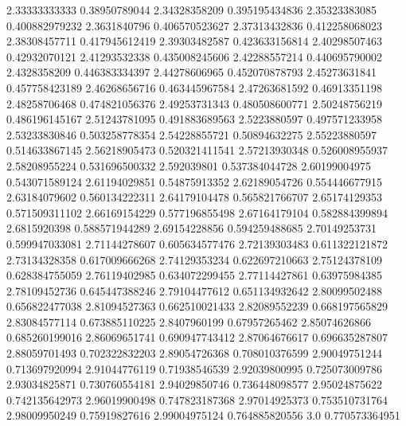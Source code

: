   2.33333333333    0.38950789044
  2.34328358209   0.395195434836
  2.35323383085   0.400882979232
   2.3631840796   0.406570523627
  2.37313432836   0.412258068023
  2.38308457711   0.417945612419
  2.39303482587   0.423633156814
  2.40298507463    0.42932070121
  2.41293532338   0.435008245606
  2.42288557214   0.440695790002
   2.4328358209   0.446383334397
  2.44278606965   0.452070878793
  2.45273631841   0.457758423189
  2.46268656716   0.463445967584
  2.47263681592    0.46913351198
  2.48258706468   0.474821056376
  2.49253731343   0.480508600771
  2.50248756219   0.486196145167
  2.51243781095   0.491883689563
   2.5223880597   0.497571233958
  2.53233830846   0.503258778354
  2.54228855721    0.50894632275
  2.55223880597   0.514633867145
  2.56218905473   0.520321411541
  2.57213930348   0.526008955937
  2.58208955224   0.531696500332
    2.592039801   0.537384044728
  2.60199004975   0.543071589124
  2.61194029851    0.54875913352
  2.62189054726   0.554446677915
  2.63184079602   0.560134222311
  2.64179104478   0.565821766707
  2.65174129353   0.571509311102
  2.66169154229   0.577196855498
  2.67164179104   0.582884399894
   2.6815920398   0.588571944289
  2.69154228856   0.594259488685
  2.70149253731   0.599947033081
  2.71144278607   0.605634577476
  2.72139303483   0.611322121872
  2.73134328358   0.617009666268
  2.74129353234   0.622697210663
  2.75124378109   0.628384755059
  2.76119402985   0.634072299455
  2.77114427861    0.63975984385
  2.78109452736   0.645447388246
  2.79104477612   0.651134932642
  2.80099502488   0.656822477038
  2.81094527363   0.662510021433
  2.82089552239   0.668197565829
  2.83084577114   0.673885110225
   2.8407960199    0.67957265462
  2.85074626866   0.685260199016
  2.86069651741   0.690947743412
  2.87064676617   0.696635287807
  2.88059701493   0.702322832203
  2.89054726368   0.708010376599
  2.90049751244   0.713697920994
  2.91044776119    0.71938546539
  2.92039800995   0.725073009786
  2.93034825871   0.730760554181
  2.94029850746   0.736448098577
  2.95024875622   0.742135642973
  2.96019900498   0.747823187368
  2.97014925373   0.753510731764
  2.98009950249    0.75919827616
  2.99004975124   0.764885820556
            3.0   0.770573364951
